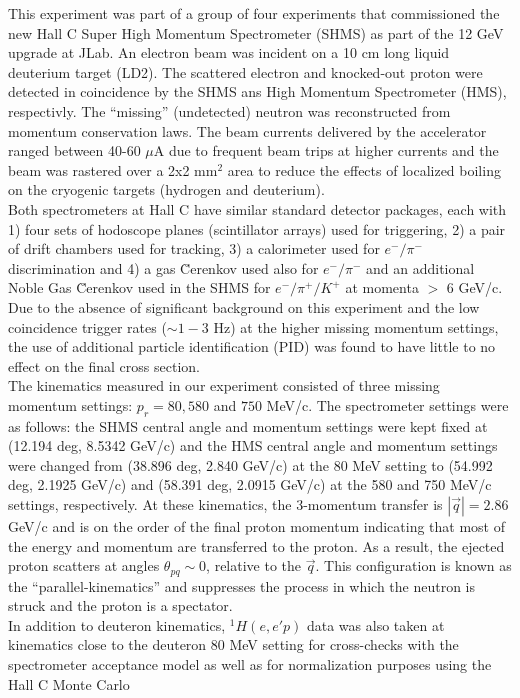 \indent This experiment was part of a group of four experiments that commissioned the new Hall C Super High Momentum Spectrometer (SHMS) as part of the 12 GeV upgrade at JLab.
An electron beam was incident on a 10 cm long liquid deuterium target (LD2). The scattered electron and knocked-out proton were detected in coincidence
by the SHMS ans High Momentum Spectrometer (HMS), respectivly. The ``missing'' (undetected) neutron was reconstructed from momentum conservation laws.
The beam currents delivered by the accelerator ranged between 40-60 $\mu$A due to frequent beam trips at higher currents and the beam was rastered over a 2x2 mm$^{2}$ area to reduce
the effects of localized boiling on the cryogenic targets (hydrogen and deuterium). \\
\indent Both spectrometers at Hall C have similar standard detector packages, each with 1) four sets of hodoscope planes (scintillator arrays) used for triggering,
2) a pair of drift chambers used for tracking, 3) a calorimeter used for $e^{-}/\pi^{-}$ discrimination and 4) a gas \u{C}erenkov used also for $e^{-}/\pi^{-}$ and an additional
Noble Gas \u{C}erenkov used in the SHMS for $e^{-}/\pi^{+}/K^{+}$ at momenta $>$ 6 GeV/c. Due to the absence of significant background on this experiment and the low coincidence trigger rates
($\sim 1-3$ Hz) at the higher missing momentum settings, the use of additional particle identification (PID) was found to have little to no effect on the final cross section. \\
\indent The kinematics measured in our experiment consisted of three missing momentum settings: $p_{r}=80,580$ and $750$ MeV/c.
The spectrometer settings were as follows: the SHMS central angle and momentum settings were kept fixed at (12.194 deg, 8.5342 GeV/c) and the HMS central angle and momentum settings were changed from
(38.896 deg, 2.840 GeV/c) at the 80 MeV setting to (54.992 deg, 2.1925 GeV/c) and (58.391 deg, 2.0915 GeV/c) at the 580 and 750 MeV/c settings, respectively. At these kinematics, the
3-momentum transfer is $|\vec{q}| = 2.86$ GeV/c and is on the order of the final proton momentum indicating that most of the energy and momentum are transferred to the proton. As a result, the ejected proton
scatters at angles $\theta_{pq}\sim 0$, relative to the $\vec{q}$. This configuration is known as the ``parallel-kinematics'' and suppresses the process in which the neutron is struck and the proton is a spectator. \\
\indent In addition to deuteron kinematics,  $^{1}H(e,e'p)$ data was also taken at kinematics close to the deuteron 80 MeV setting for cross-checks with the spectrometer acceptance model as well as for normalization purposes using the  Hall C Monte Carlo
